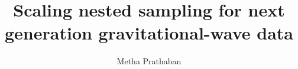 \documentclass[aspectratio=169, 11pt]{beamer}
\title[Inference techniques in gravitational-wave science ] %
{Scaling nested sampling for next generation gravitational-wave data \\ \vspace{0.5em}
}
\author[Metha Prathaban] %
{Metha Prathaban} %
\date{}
\def \bblock{\begin{beamerboxesrounded}[upper=uppercolor,lower=lowercolor,shadow=true]}
\def \eblock{\end{beamerboxesrounded}}
\begin{document}
\frame{\titlepage}
\end{document}
